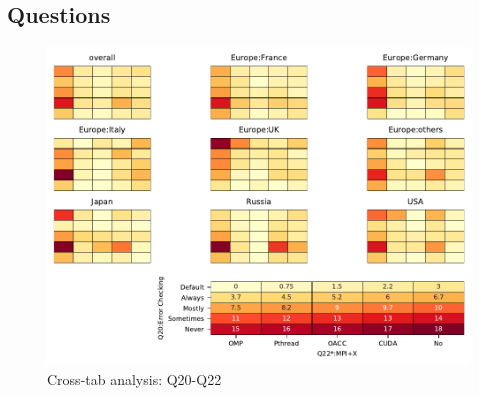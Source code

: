 
\subsection{Questions}


\begin{figure}
\begin{center}
\includegraphics[width=12cm]{../pdfs/Q20-Q22.pdf}
\caption{Cross-tab analysis: Q20-Q22}
\label{fig:Q20-Q22}
\end{center}
\end{figure}
